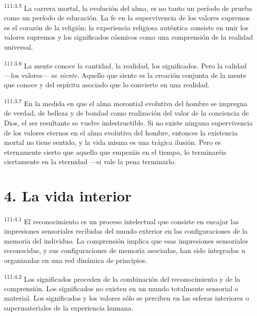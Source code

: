 \par
\textsuperscript{111:3.5} La carrera mortal, la evolución del alma, es no tanto un período de prueba como un período de educación. La fe en la supervivencia de los valores supremos es el corazón de la religión; la experiencia religiosa auténtica consiste en unir los valores supremos y los significados cósmicos como una comprensión de la realidad universal.

\par
\textsuperscript{111:3.6} La mente conoce la cantidad, la realidad, los significados. Pero la calidad ---los valores--- se \textit{siente}. Aquello que siente es la creación conjunta de la mente que conoce y del espíritu asociado que lo convierte en una realidad.

\par
\textsuperscript{111:3.7} En la medida en que el alma morontial evolutiva del hombre se impregna de verdad, de belleza y de bondad como realización del valor de la conciencia de Dios, el ser resultante se vuelve indestructible. Si no existe ninguna supervivencia de los valores eternos en el alma evolutiva del hombre, entonces la existencia mortal no tiene sentido, y la vida misma es una trágica ilusión. Pero es eternamente cierto que aquello que empezáis en el tiempo, lo terminaréis ciertamente en la eternidad ---si vale la pena terminarlo.

\section*{4. La vida interior}
\par
\textsuperscript{111:4.1} El reconocimiento es un proceso intelectual que consiste en encajar las impresiones sensoriales recibidas del mundo exterior en las configuraciones de la memoria del individuo. La comprensión implica que esas impresiones sensoriales reconocidas, y sus configuraciones de memoria asociadas, han sido integradas u organizadas en una red dinámica de principios.

\par
\textsuperscript{111:4.2} Los significados proceden de la combinación del reconocimiento y de la comprensión. Los significados no existen en un mundo totalmente sensorial o material. Los significados y los valores sólo se perciben en las esferas interiores o supermateriales de la experiencia humana.

